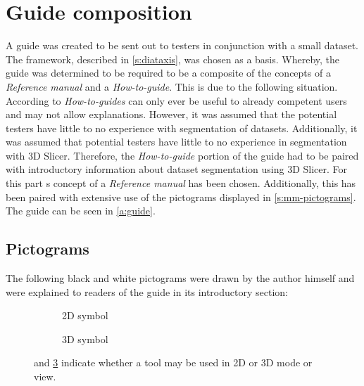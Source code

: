 \section{Guide composition}\label{s:guide_comp}
A guide was created to be sent out to testers in conjunction with a small dataset.
The \diatx\space framework, described in \cref{s:diataxis}, was chosen as a basis.
Whereby, the guide was determined to be required to be a composite of the \diatx\space concepts of a
\textit{Reference manual} and a \textit{How-to-guide}.
This is due to the following situation.
According to \citeauthor{procidaDiataxisDocumentationFramework2023} \textit{How-to-guides} can only ever be useful to already competent users and may not allow explanations.
However, it was assumed that the potential testers have little to no experience with segmentation of \mct\space datasets.
Additionally, it was assumed that potential testers have little to no experience in segmentation with 3D Slicer.
Therefore, the \textit{How-to-guide} portion of the guide had to be paired with introductory information about \mct\space dataset segmentation using 3D Slicer.
For this part \citeauthor{procidaDiataxisDocumentationFramework2023}s \diatx\space concept of a \textit{Reference manual} has been chosen.
Additionally, this has been paired with extensive use of the pictograms displayed in \cref{s:mm-pictograms}.
The guide can be seen in \cref{a:guide}.


\subsection*{Pictograms}\label{s:mm-pictograms}
The following black and white pictograms were drawn by the author himself and were explained to readers of the guide in its introductory section:
\newline
\begin{figure}[h!]
	\begin{centering}
		\begin{subfigure}{0.5\textwidth}
			
			\caption{2D symbol}\label{fig:2d_icon}
		\end{subfigure}
		\begin{subfigure}{0.5\textwidth}
			
			\caption{3D symbol}\label{fig:3d_icon}
		\end{subfigure}
	\end{centering}
	\caption{ and \cref{fig:3d_icon} indicate whether a tool may be used in 2D or 3D mode or view.}
\end{figure}

